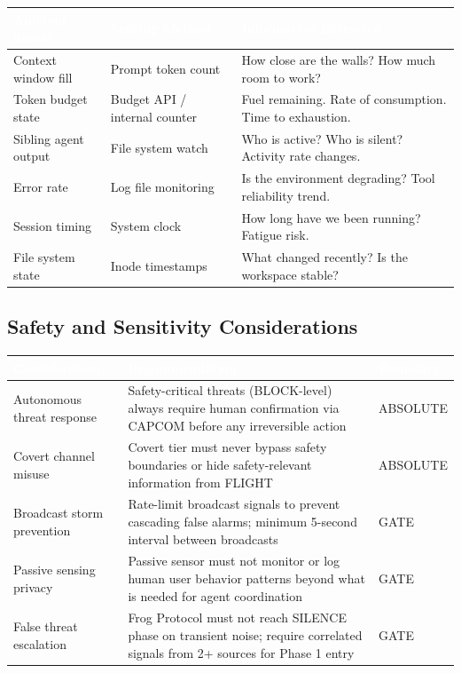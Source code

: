 \documentclass[11pt,letterpaper]{article}
\newcommand{\tableheader}[1]{\textbf{\sffamily\textcolor{white}{#1}}}
\begin{document}
\begin{center}
\begin{tabularx}{\textwidth}{L{3.5cm}L{3cm}X}
\toprule
{}
\tableheader{Ambient Signal} & \tableheader{Sensing Method} & \tableheader{Information Extracted} \\
\midrule
Context window fill & Prompt token count & How close are the walls? How much room to work? \\
Token budget state & Budget API / internal counter & Fuel remaining. Rate of consumption. Time to exhaustion. \\
Sibling agent output & File system watch & Who is active? Who is silent? Activity rate changes. \\
Error rate & Log file monitoring & Is the environment degrading? Tool reliability trend. \\
Session timing & System clock & How long have we been running? Fatigue risk. \\
File system state & Inode timestamps & What changed recently? Is the workspace stable? \\
\bottomrule
\end{tabularx}
\end{center}

\subsection{Safety and Sensitivity Considerations}

\begin{center}
\begin{tabularx}{\textwidth}{L{4cm}L{4cm}C{2.5cm}}
\toprule
{}
\tableheader{Consideration} & \tableheader{Recommendation} & \tableheader{Boundary} \\
\midrule
Autonomous threat response & Safety-critical threats (BLOCK-level) always require human confirmation via CAPCOM before any irreversible action & ABSOLUTE \\
Covert channel misuse & Covert tier must never bypass safety boundaries or hide safety-relevant information from FLIGHT & ABSOLUTE \\
Broadcast storm prevention & Rate-limit broadcast signals to prevent cascading false alarms; minimum 5-second interval between broadcasts & GATE \\
Passive sensing privacy & Passive sensor must not monitor or log human user behavior patterns beyond what is needed for agent coordination & GATE \\
False threat escalation & Frog Protocol must not reach SILENCE phase on transient noise; require correlated signals from 2+ sources for Phase 1 entry & GATE \\
\bottomrule
\end{tabularx}
\end{center}
\end{document}
